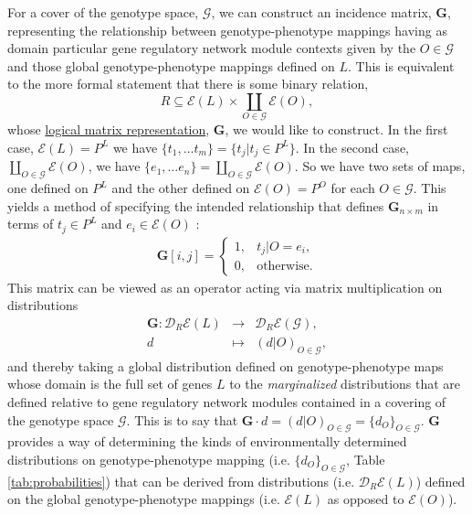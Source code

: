 For a cover of the genotype space, $\mathcal{G}$, we can construct an incidence matrix, $\mathbf{G}$, representing the relationship between genotype-phenotype mappings having as domain particular gene regulatory network module contexts given by the $O \in \mathcal{G}$ and those global genotype-phenotype mappings defined on $L$. This is equivalent to the more formal statement that there is some binary relation,
\begin{equation}
R \subseteq \mathcal{E}(L) \times \coprod_{O \in \mathcal{G}} \mathcal{E}(O),
\end{equation}
whose \href{http://en.wikipedia.org/wiki/Logical_matrix#Matrix_representation_of_a_relation}{logical matrix representation}, $\mathbf{G}$, we would like to construct. In the first case, $\mathcal{E}(L) = P^L$ we have $\{t_1, \ldots t_m\} = \{t_j | t_j \in P^L\}$. In the second case, $\coprod_{O \in \mathcal{G}} \mathcal{E}(O)$, we have $\{e_1, \ldots e_n\} = \coprod_{O \in \mathcal{G}} \mathcal{E}(O)$. So we have two sets of maps, one defined on $P^L$ and the other defined on $\mathcal{E}(O) = P^O$ for each $O \in \mathcal{G}$. This yields a method of specifying the intended relationship that defines $\mathbf{G}_{n \times m}$ in terms of $t_j \in P^L$ and $e_i \in \mathcal{E}(O)$ :
\begin{eqnarray}
\mathbf{G}[i,j] =
\begin{cases}
1, & t_j|O = e_i,\\
0, & \text{otherwise}.
\end{cases}
\end{eqnarray}
This matrix can be viewed as an operator acting via matrix multiplication on distributions
\begin{eqnarray*}
\mathbf{G} \colon \mathcal{D}_R\mathcal{E}(L) &\rightarrow& \mathcal{D}_R\mathcal{E}(\mathcal{G}),\\
d &\mapsto& (d|O)_{O \in \mathcal{G}},
\end{eqnarray*}
and thereby taking a global distribution defined on genotype-phenotype maps whose domain is the full set of genes $L$ to the \emph{marginalized} distributions that are defined relative to gene regulatory network modules contained in a covering of the genotype space $\mathcal{G}$. This is to say that $\mathbf{G} \cdot d = (d|O)_{O \in \mathcal{G}} = \{d_O\}_{O \in \mathcal{G}}$. $\mathbf{G}$ provides a way of determining the kinds of environmentally determined distributions on genotype-phenotype mapping (i.e. $\{d_O\}_{O \in \mathcal{G}}$, Table \ref{tab:probabilities}) that can be derived from distributions (i.e. $\mathcal{D}_R \mathcal{E}(L)$) defined on the global genotype-phenotype mappings (i.e. $\mathcal{E}(L)$ as opposed to $\mathcal{E}(O)$).

